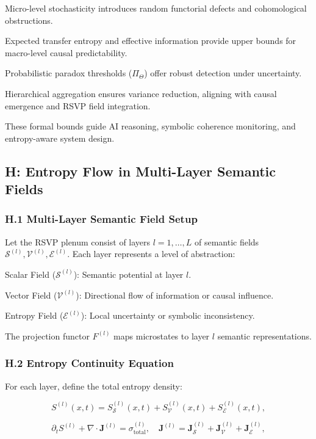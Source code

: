 \documentclass[12pt]{article}
\theoremstyle{plain}
\begin{document}
Micro-level stochasticity introduces random functorial defects and cohomological obstructions.

Expected transfer entropy and effective information provide upper bounds for macro-level causal predictability.

Probabilistic paradox thresholds (\(\Pi_\Theta\)) offer robust detection under uncertainty.

Hierarchical aggregation ensures variance reduction, aligning with causal emergence and RSVP field integration.

These formal bounds guide AI reasoning, symbolic coherence monitoring, and entropy-aware system design.

\subsection*{H: Entropy Flow in Multi-Layer Semantic Fields}

\subsubsection*{H.1 Multi-Layer Semantic Field Setup}

Let the RSVP plenum consist of layers \(l = 1, \dots, L\) of semantic fields \(\mathcal{S}^{(l)}, \mathcal{V}^{(l)}, \mathcal{E}^{(l)}\). Each layer represents a level of abstraction:

Scalar Field (\(\mathcal{S}^{(l)}\)): Semantic potential at layer \(l\).

Vector Field (\(\mathcal{V}^{(l)}\)): Directional flow of information or causal influence.

Entropy Field (\(\mathcal{E}^{(l)}\)): Local uncertainty or symbolic inconsistency.

The projection functor \(F^{(l)}\) maps microstates to layer \(l\) semantic representations.

\subsubsection*{H.2 Entropy Continuity Equation}

For each layer, define the total entropy density:

\begin{equation}
S^{(l)}(x,t) = S_\mathcal{S}^{(l)}(x,t) + S_\mathcal{V}^{(l)}(x,t) + S_\mathcal{E}^{(l)}(x,t),
\end{equation}

\begin{equation}
\partial_t S^{(l)} + \nabla \cdot \mathbf{J}^{(l)} = \sigma^{(l)}_{\mathrm{total}}, \quad \mathbf{J}^{(l)} = \mathbf{J}_\mathcal{S}^{(l)} + \mathbf{J}_\mathcal{V}^{(l)} + \mathbf{J}_\mathcal{E}^{(l)},
\end{equation}
\end{document}
